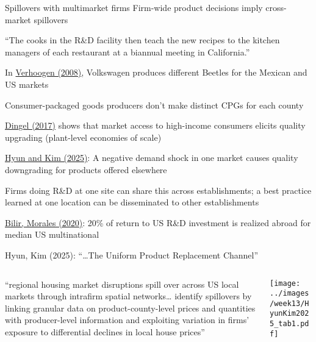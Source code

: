\documentclass[11pt,notes=hide,aspectratio=169]{beamer}
\begin{document}
\begin{frame}{Spillovers with multimarket firms}
Firm-wide product decisions imply cross-market spillovers
\begin{itemize}{\small
\item ``The cooks in the R\&D facility then teach the new recipes to the kitchen managers of each restaurant at a biannual meeting in California.''
\item In \href{https://doi.org/10.1162/qjec.2008.123.2.489}{Verhoogen (2008)}, Volkswagen produces different Beetles for the Mexican and US markets
\item Consumer-packaged goods producers don't make distinct CPGs for each county
\item \href{https://doi.org/10.1093/restud/rdw054}{Dingel (2017)} shows that market access to high-income consumers elicits quality upgrading (plant-level economies of scale) 
\item \href{https://sites.google.com/site/jungsikhyunecon/research}{Hyun and Kim (2025)}: A negative demand shock in one market  causes quality downgrading for products offered elsewhere
}\end{itemize}
Firms doing R\&D at one site can share this across establishments;
a best practice learned at one location can be disseminated to other establishments
\begin{itemize}{\small
\item \href{https://doi.org/10.1086/705418}{Bilir, Morales (2020)}:
20\% of return to US R\&D investment is realized abroad for median US multinational
}\end{itemize}
\end{frame}
\begin{frame}{Hyun, Kim (2025): ``\dots The Uniform Product Replacement Channel''}
\begin{columns}
\begin{column}{0.30\textwidth}{\footnotesize
``regional housing market disruptions spill over across US local markets through intrafirm spatial networks\dots
identify spillovers by linking granular data on product-county-level prices and quantities with producer-level information and exploiting variation in firms’ exposure to differential declines in local house prices''
\par}\end{column}
\begin{column}{0.68\textwidth}
\texttt{[image: ../images/week13/HyunKim2025\_tab1.pdf]}
\end{column}
\end{columns}
\end{frame}
\end{document}
